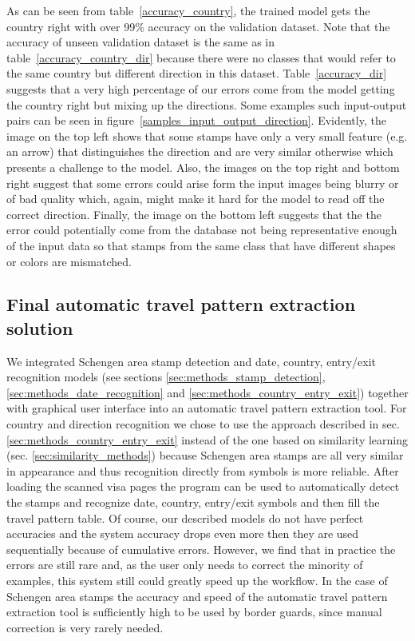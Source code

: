 \documentclass[twocolumn]{svjour3}
\begin{document}
As can be seen from table~\ref{accuracy_country}, the trained model gets the country right with over 99\% accuracy on the validation dataset. Note that the accuracy of unseen validation dataset is the same as in table~\ref{accuracy_country_dir} because there were no classes that would refer to the same country but different direction in this dataset. Table~\ref{accuracy_dir} suggests that a very high percentage of our errors come from the model getting the country right but mixing up the directions. Some examples such input-output pairs can be seen in figure~\ref{samples_input_output_direction}. Evidently, the image on the top left shows that some stamps have only a very small feature (e.g. an arrow) that distinguishes the direction and are very similar otherwise which presents a challenge to the model. Also, the images on the top right and bottom right suggest that some errors could arise form the input images being blurry or of bad quality which, again, might make it hard for the model to read off the correct direction. Finally, the image on the bottom left suggests that the the error could potentially come from the database not being representative enough of the input data so that stamps from the same class that have different shapes or colors are mismatched.

\subsection{Final automatic travel pattern extraction solution}
\label{sec:final_solution}

We integrated Schengen area stamp detection and date, country, entry/exit recognition models (see sections \ref{sec:methods_stamp_detection}, \ref{sec:methods_date_recognition} and \ref{sec:methods_country_entry_exit}) together with graphical user interface into an automatic travel pattern extraction tool. For country and direction recognition we chose to use the approach described in sec. \mbox{\ref{sec:methods_country_entry_exit}} instead of the one based on similarity learning (sec. \mbox{\ref{sec:similarity_methods}}) because Schengen area stamps are all very similar in appearance and thus recognition directly from symbols is more reliable. After loading the scanned visa pages the program can be used to automatically detect the stamps and recognize date, country, entry/exit symbols and then fill the travel pattern table. Of course, our described models do not have perfect accuracies and the system accuracy drops even more then they are used sequentially because of cumulative errors. However, we find that in practice the errors are still rare and, as the user only needs to correct the minority of examples, this system still could greatly speed up the workflow. In the case of Schengen area stamps the accuracy and speed of the automatic travel pattern extraction tool is sufficiently high to be used by border guards, since manual correction is very rarely needed.
\end{document}
